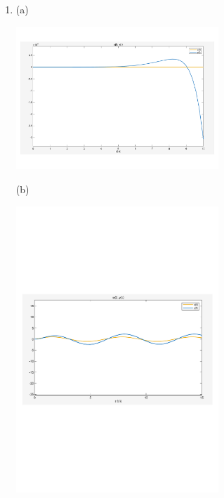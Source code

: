 \documentclass[12pt]{article}
\begin{document}
\begin{enumerate}[label=\roman*.]
    \item (a)
    \begin{center}
        \includegraphics[width=0.6\textwidth]{Q2sima.png}
    \end{center}
    (b)
    \begin{center}
        \includegraphics[width=0.6\textwidth]{Q2simb.png}
    \end{center}


\end{enumerate}
\end{document}
